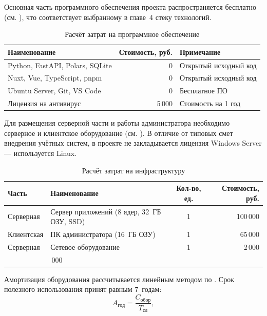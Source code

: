 Основная часть программного обеспечения проекта распространяется бесплатно (см. ), что соответствует выбранному в главе~4 стеку технологий.

\begin{table}[H]
	\centering
	\caption{Расчёт затрат на программное обеспечение}
	\label{tab:software}
	\begin{tabularx}{\textwidth}{|>{\raggedright\arraybackslash}X|r|>{\raggedright\arraybackslash}X|}
		\hline
		\textbf{Наименование} & \textbf{Стоимость, руб.} & \textbf{Примечание} \\
		\hline
		Python, FastAPI, Polars, SQLite & 0 & Открытый исходный код \\
		\hline
		Nuxt, Vue, TypeScript, pnpm & 0 & Открытый исходный код \\
		\hline
		Ubuntu Server, Git, VS Code & 0 & Бесплатное ПО \\
		\hline
		Лицензия на антивирус & 5\,000 & Стоимость на 1 год \\
		\hline
	\end{tabularx}
\end{table}

Для размещения серверной части и работы администратора необходимо серверное и клиентское оборудование (см. ). В отличие от типовых смет внедрения учётных систем, в проекте не закладывается лицензия Windows Server --- используется Linux.

\begin{table}[H]
	\centering
	\caption{Расчёт затрат на инфраструктуру}
	\label{tab:infra}
	\begin{tabularx}{\textwidth}{|>{\raggedright\arraybackslash}p{2.5cm}|>{\raggedright\arraybackslash}X|c|r|}
		\hline
		\textbf{Часть} & \textbf{Наименование} & \textbf{Кол-во, ед.} & \textbf{Стоимость, руб.} \\
		\hline
		Серверная & Сервер приложений (8 ядер, 32~ГБ ОЗУ, SSD) & 1 & 100\,000 \\
		\hline
		Клиентская & ПК администратора (16~ГБ ОЗУ) & 1 & 65\,000 \\
		\hline
		Серверная & Сетевое оборудование & 1 & 2\,000 \\
		\hline
		\multicolumn{3}{|r|}{Итого} & 167\,000 \\
		\hline
	\end{tabularx}
\end{table}

Амортизация оборудования рассчитывается линейным методом по . Срок полезного использования принят равным 7~годам:
\begin{equation}
	A_{\mathrm{год}} = \frac{C_{\mathrm{обор}}}{T_{\mathrm{сл}}},
	\label{eq:amort-year}
\end{equation}

